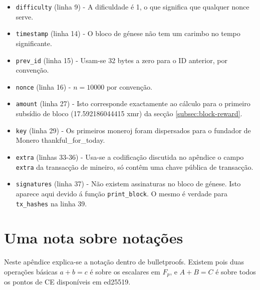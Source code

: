 \begin{appendices}
\begin{itemize}
	\item {\tt difficulty} (linha 9) - A dificuldade é 1, o que significa que qualquer nonce serve.
	\item {\tt timestamp} (linha 14) - O bloco de génese não tem um carimbo no tempo significante.
	\item {\tt prev\_id} (linha 15) - Usam-se 32 bytes a zero para o ID anterior, por convenção.
	\item {\tt nonce} (linha 16) - $n = 10000$ por convenção.
	\item {\tt amount} (linha 27) - Isto corresponde exactamente ao cálculo para o primeiro subsídio de bloco (17.592186044415 xmr) da secção \ref{subsec:block-reward}.
	\item {\tt key} (linha 29) - Os primeiros moneroj foram dispersados para o fundador de Monero thankful\_for\_today.
	\item {\tt extra} (linhas 33-36) - 
Usa-se a codificação discutida no apêndice %
o campo {\tt extra} da transacção de mineiro, só contêm uma chave pública de transacção.   
	\item {\tt signatures} (linha 37) - Não existem assinaturas no bloco de génese. Isto aparece aqui devido á função {\tt print\_block}. O mesmo é verdade para {\tt tx\_hashes} na linha 39.
\end{itemize}

\chapter{Uma nota sobre notações}
\label{appendix:nota}

Neste apêndice explica-se a notação dentro de bulletproofs. Existem pois duas operações básicas $a+b=c$ é sobre os escalares em $F_p$, e $A+B=C$ é sobre todos os pontos de CE disponíveis em ed25519.


\end{appendices}
